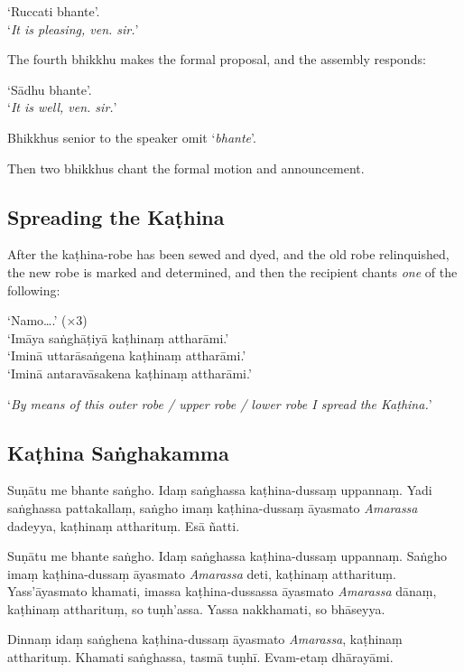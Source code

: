‘Ruccati bhante’.\\
‘\emph{It is pleasing, ven. sir.}’

The fourth bhikkhu makes the formal proposal, and the assembly responds:

‘Sādhu bhante’.\\
‘\emph{It is well, ven. sir.}’

Bhikkhus senior to the speaker omit ‘\emph{bhante}’.

Then two bhikkhus chant the formal motion and announcement.


\subsection{Spreading the Kaṭhina}

After the kaṭhina-robe has been sewed and dyed, and the old robe relinquished,
the new robe is marked and determined, and then the recipient chants \emph{one}
of the following:

‘Namo….’ (×3)\\
‘Imāya saṅghāṭiyā kaṭhinaṃ attharāmi.’\\
‘Iminā uttarāsaṅgena kaṭhinaṃ attharāmi.’\\
‘Iminā antaravāsakena kaṭhinaṃ attharāmi.’

‘\emph{By means of this outer robe / upper robe / lower robe I spread the Kaṭhina.}’


\clearpage

\subsection{Kaṭhina Saṅghakamma}


Suṇātu me bhante saṅgho. Idaṃ saṅghassa kaṭhina-dussaṃ uppannaṃ. Yadi saṅghassa
pattakallaṃ, saṅgho imaṃ kaṭhina-dussaṃ āyasmato \emph{Amarassa} dadeyya,
kaṭhinaṃ attharituṃ. Esā ñatti.

Suṇātu me bhante saṅgho. Idaṃ saṅghassa kaṭhina-dussaṃ uppannaṃ. Saṅgho imaṃ
kaṭhina-dussaṃ āyasmato \emph{Amarassa} deti, kaṭhinaṃ attharituṃ.
Yass'āyasmato khamati, imassa kaṭhina-dussassa āyasmato \emph{Amarassa} dānaṃ,
kaṭhinaṃ attharituṃ, so tuṇh'assa. Yassa nakkhamati, so bhāseyya.

Dinnaṃ idaṃ saṅghena kaṭhina-dussaṃ āyasmato \emph{Amarassa}, kaṭhinaṃ
attharituṃ. Khamati saṅghassa, tasmā tuṇhī. Evam-etaṃ dhārayāmi.

